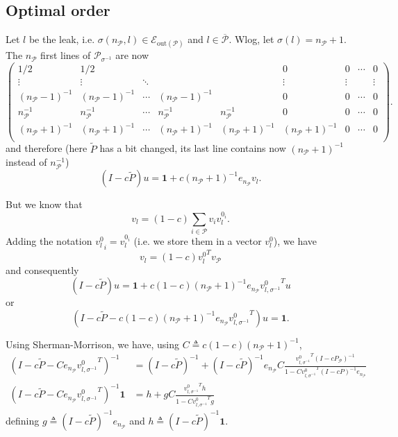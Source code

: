 \documentclass{article}
\newcommand{\1}{\mathbf{1}}
\theoremstyle{definition}
\begin{document}
\subsection{Optimal order}
Let \(l\) be the leak, i.e. \(\sigma(n_\mathcal{P},l) \in \mathcal{E}_{\text{out}(\mathcal{P})}\) and \(l \in \overline{\mathcal{P}}\).
Wlog, let \(\sigma(l) = n_{\mathcal{P}}+1\).
The \(n_\mathcal{P}\) first lines of \(\mathcal{P}_{\sigma^{-1}}\) are now
\[
  \begin{pmatrix}
    1/2 & 1/2 & & & & 0 & 0 & \cdots & 0\\
    \vdots & \vdots & \ddots & & & \vdots & \vdots & & \vdots \\
    (n_\mathcal{P}-1)^{-1} & (n_\mathcal{P}-1)^{-1} & \cdots & (n_\mathcal{P}-1)^{-1} & & 0 & 0 & \cdots & 0\\
    n_\mathcal{P}^{-1} & n_\mathcal{P}^{-1} & \cdots & n_\mathcal{P}^{-1} & n_\mathcal{P}^{-1} & 0 & 0 & \cdots & 0\\
    (n_\mathcal{P}+1)^{-1} & (n_\mathcal{P}+1)^{-1} & \cdots & (n_\mathcal{P}+1)^{-1} & (n_\mathcal{P}+1)^{-1} & (n_\mathcal{P}+1)^{-1} & 0 & \cdots & 0\\
  \end{pmatrix}.
\]
and therefore (here $\tilde{P}$ has a bit changed, its last line contains now $(n_\mathcal{P}+1)^{-1}$ instead of $n_\mathcal{P}^{-1}$)
\[ (I - c\tilde{P})u = \1 + c (n_\mathcal{P}+1)^{-1} e_{n_\mathcal{P}} v_l. \]

But we know that
\[ v_l = (1-c) \sum_{i \in \mathcal{P}} v_i v_l^{0_i}. \]
Adding the notation ${v_l^0}_i = v_l^{0_i}$ (i.e. we store them in a vector $v_l^0$),
we have
\[ v_l = (1-c) {v_l^0}^T v_\mathcal{P} \]
and consequently
\[ (I - c\tilde{P})u = \1 + c (1-c) (n_\mathcal{P}+1)^{-1} e_{n_\mathcal{P}} {v_{l,\sigma^{-1}}^0}^T u \]
or
\[ (I - c\tilde{P} - c (1-c) (n_\mathcal{P}+1)^{-1} e_{n_\mathcal{P}} {v_{l,\sigma^{-1}}^0}^T)u = \1. \]

Using Sherman-Morrison, we have, using $C \triangleq c(1-c)(n_\mathcal{P}+1)^{-1}$,
\begin{align*}
  (I - c\tilde{P} - C e_{n_\mathcal{P}} {v_{l,\sigma^{-1}}^0}^T)^{-1} & = (I - c\tilde{P})^{-1} + (I - c\tilde{P})^{-1}e_{n_\mathcal{P}} C \frac{{v_{l,\sigma^{-1}}^0}^T(I-cP_\mathcal{P})^{-1}}{1 - C{v_{l,\sigma^{-1}}^0}^T(I-cP)^{-1}e_{n_\mathcal{P}}}\\
  (I - c\tilde{P} - C e_{n_\mathcal{P}} {v_{l,\sigma^{-1}}^0}^T)^{-1}\1 & = h + g C \frac{{v_{l,\sigma^{-1}}^0}^Th}{1 - C {v_{l,\sigma^{-1}}^0}^Tg}
\end{align*}
defining \(g \triangleq (I - c\tilde{P})^{-1}e_{n_\mathcal{P}}\) and \(h \triangleq (I - c\tilde{P})^{-1}\1\).
\end{document}
